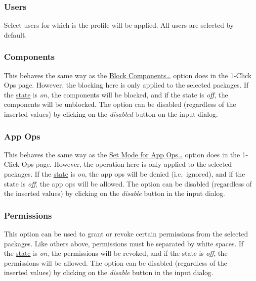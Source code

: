 \subsubsection{Users} %
Select users for which is the profile will be applied. All users are selected by default.

\subsubsection{Components} %
This behaves the same way as the \hyperref[subsec:block-components-dots]{Block Components\dots} option does in the
1-Click Ops page. However, the blocking here is only applied to the selected packages.
If the \hyperref[subsubsec:profile-state]{state} is \textit{on}, the components will be blocked,
and if the state is \textit{off}, the components will be unblocked.
The option can be disabled (regardless of the inserted values) by clicking on the \textit{disabled} button on the input dialog.


\subsubsection{App Ops} %
This behaves the same way as the \hyperref[subsec:set-mode-for-app-ops-dots]{Set Mode for App Ops\dots} option does in
the 1-Click Ops page. However, the operation here is only applied to the selected packages.
If the \hyperref[subsubsec:profile-state]{state} is \textit{on}, the app ops will be denied (i.e.\ ignored),
and if the state is \textit{off}, the app ops will be allowed. The option can be disabled (regardless of the inserted
values) by clicking on the \textit{disable} button in the input dialog.

\subsubsection{Permissions} %
This option can be used to grant or revoke certain permissions from the selected packages. Like others above,
permissions must be separated by white spaces. If the \hyperref[subsubsec:profile-state]{state} is \textit{on}, the
permissions will be revoked, and if the state is \textit{off}, the permissions will be allowed. The option can be
disabled (regardless of the inserted values) by clicking on the \textit{disable} button in the input dialog.


